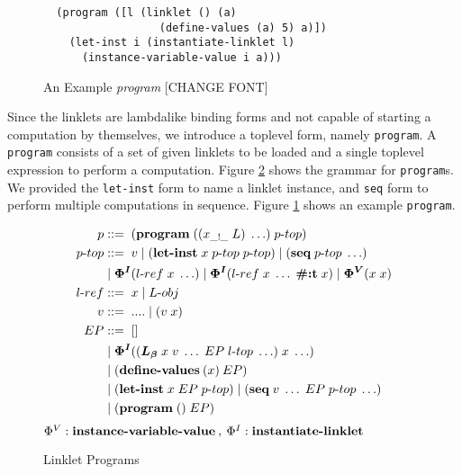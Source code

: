 \documentclass[sigplan,screen,anonymous]{acmart}
\def\dash {\text{-}}
\begin{document}
\begin{figure}[h]
  \small
\begin{lstlisting}
  (program ([l (linklet () (a)
                  (define-values (a) 5) a)])
    (let-inst i (instantiate-linklet l)
      (instance-variable-value i a)))
\end{lstlisting}
\caption{An Example \textit{program} [CHANGE FONT]}
\label{fig:program-example}
\end{figure}

Since the linklets are lambda\dash like binding forms and not capable
of starting a computation by themselves, we introduce a top\dash level
form, namely \verb|program|. A \verb|program| consists of a set of
given linklets to be loaded and a single top\dash level expression to
perform a computation. Figure \ref{fig:linklet-program} shows the
grammar for \verb|program|s. We provided the \verb|let-inst| form to
name a linklet instance, and \verb|seq| form to perform multiple
computations in sequence. Figure \ref{fig:program-example} shows an
example \verb|program|.



\begin{figure}[h!]
  \begin{align*}
    p           &::=\; (\textbf{program}\; ((x_{\_!\_}\; L)\; \ldots)\; p\dash top) \\
    p\dash top  &::=\; v\; |\; (\textbf{let\dash inst}\; x\; p\dash top\;p\dash top)\; |\; (\textbf{seq}\; p\dash top\; \ldots) \\
    \;          &\;|\; \bm{\Phi^I}(l\dash ref\; x\; \ldots)\; |\; \bm{\Phi^I}(l\dash ref\; x\; \ldots\; \textbf{\#:t}\; x)\; |\; \bm{\Phi^V}(x\; x) \\
    l\dash ref &::=\; x\; |\; L\dash obj \\
    v           &::=\; ....\;|\;(v\;x) \\
    EP          &::=\; [] \\
    \;          &\;|\; \bm{\Phi^I}((\lb\; x\; v\; \ldots\; EP\; l\dash top\; \ldots)\; x\; \ldots) \\
    \;          &\;|\; (\textbf{define\dash values}\:(x)\:EP) \\
    \;          &\;|\; (\textbf{let\dash inst}\; x\; EP\; p\dash top)\; |\; (\textbf{seq}\; v\; \ldots\; EP\; p\dash top\; \ldots) \\
    \;          &\;|\; (\textbf{program}\; ()\; EP) \\
  \end{align*}
  \hfill \footnotesize $\Phi^V : \textbf{instance\dash variable\dash value}\:,\: \Phi^I : \textbf{instantiate\dash linklet}$
\caption{Linklet Programs}
\label{fig:linklet-program}
\end{figure}
\end{document}
